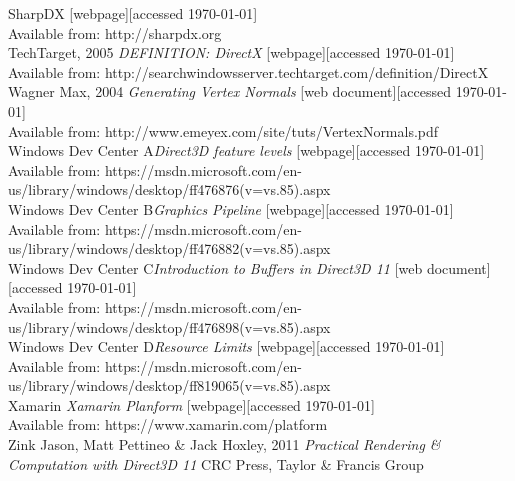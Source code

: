 \documentclass[twoside, english, 11pt]{report}
\begin{document}
\small SharpDX [webpage][accessed \today] \\
Available from: http://sharpdx.org\\

\small TechTarget, 2005 \textit{DEFINITION: DirectX} [webpage][accessed \today] \\
Available from: http://searchwindowsserver.techtarget.com/definition/DirectX\\

\small Wagner Max, 2004 \textit{Generating Vertex Normals} [web document][accessed \today] \\
Available from: http://www.emeyex.com/site/tuts/VertexNormals.pdf\\

\small Windows Dev Center A\textit{Direct3D feature levels} [webpage][accessed \today] \\
Available from: https://msdn.microsoft.com/en-us/library/windows/desktop/ff476876(v=vs.85).aspx\\

\small Windows Dev Center B\textit{Graphics Pipeline} [webpage][accessed \today] \\
Available from: https://msdn.microsoft.com/en-us/library/windows/desktop/ff476882(v=vs.85).aspx\\

\small Windows Dev Center C\textit{Introduction to Buffers in Direct3D 11} [web document][accessed \today] \\
Available from: https://msdn.microsoft.com/en-us/library/windows/desktop/ff476898(v=vs.85).aspx\\

\small Windows Dev Center D\textit{Resource Limits } [webpage][accessed \today] \\
Available from: https://msdn.microsoft.com/en-us/library/windows/desktop/ff819065(v=vs.85).aspx\\

\small Xamarin \textit{Xamarin Planform} [webpage][accessed \today] \\
Available from: https://www.xamarin.com/platform\\

\small Zink Jason, Matt Pettineo \& Jack Hoxley, 2011 \textit{Practical Rendering \& Computation with Direct3D 11} CRC Press, Taylor \& Francis Group \\
\end{document}
